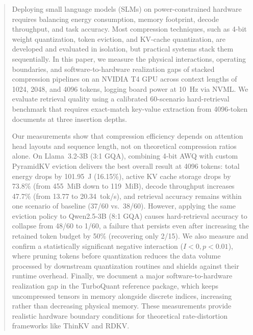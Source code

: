 \documentclass[sigconf,nonacm]{acmart}
\begin{document}
\begin{abstract}
Deploying small language models (SLMs) on power-constrained hardware requires balancing energy consumption, memory footprint, decode throughput, and task accuracy. Most compression techniques, such as 4-bit weight quantization, token eviction, and KV-cache quantization, are developed and evaluated in isolation, but practical systems stack them sequentially. In this paper, we measure the physical interactions, operating boundaries, and software-to-hardware realization gaps of stacked compression pipelines on an NVIDIA T4 GPU across context lengths of 1024, 2048, and 4096 tokens, logging board power at 10~Hz via NVML. We evaluate retrieval quality using a calibrated 60-scenario hard-retrieval benchmark that requires exact-match key-value extraction from 4096-token documents at three insertion depths.

Our measurements show that compression efficiency depends on attention head layouts and sequence length, not on theoretical compression ratios alone. On Llama~3.2-3B (3:1 GQA), combining 4-bit AWQ with custom PyramidKV eviction delivers the best overall result at 4096 tokens: total energy drops by 101.95~J (16.15\%), active KV cache storage drops by 73.8\% (from 455~MiB down to 119~MiB), decode throughput increases 47.7\% (from 13.77 to 20.34~tok/s), and retrieval accuracy remains within one scenario of baseline (37/60 vs.\ 38/60). However, applying the same eviction policy to Qwen2.5-3B (8:1 GQA) causes hard-retrieval accuracy to collapse from 48/60 to 1/60, a failure that persists even after increasing the retained token budget by 50\% (recovering only 2/15). We also measure and confirm a statistically significant negative interaction ($I < 0, p < 0.01$), where pruning tokens before quantization reduces the data volume processed by downstream quantization routines and shields against their runtime overhead. Finally, we document a major software-to-hardware realization gap in the TurboQuant reference package, which keeps uncompressed tensors in memory alongside discrete indices, increasing rather than decreasing physical memory. These measurements provide realistic hardware boundary conditions for theoretical rate-distortion frameworks like ThinKV and RDKV.
\end{abstract}

\end{document}
